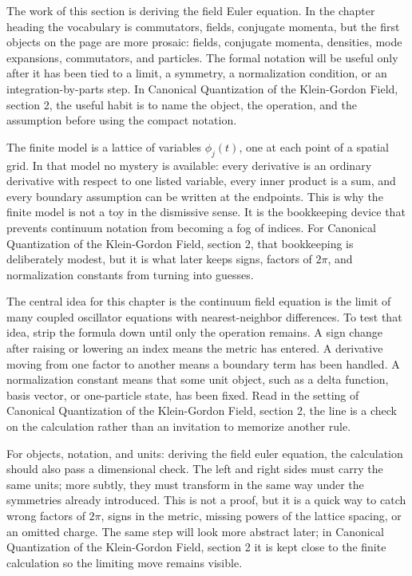 The work of this section is deriving the field Euler equation.  In the chapter heading the vocabulary is commutators, fields, conjugate momenta, but the first objects on the page are more prosaic: fields, conjugate momenta, densities, mode expansions, commutators, and particles.  The formal notation will be useful only after it has been tied to a limit, a symmetry, a normalization condition, or an integration-by-parts step.  In Canonical Quantization of the Klein-Gordon Field, section 2, the useful habit is to name the object, the operation, and the assumption before using the compact notation.

The finite model is a lattice of variables \(\phi_j(t)\), one at each point of a spatial grid.  In that model no mystery is available: every derivative is an ordinary derivative with respect to one listed variable, every inner product is a sum, and every boundary assumption can be written at the endpoints.  This is why the finite model is not a toy in the dismissive sense.  It is the bookkeeping device that prevents continuum notation from becoming a fog of indices.  For Canonical Quantization of the Klein-Gordon Field, section 2, that bookkeeping is deliberately modest, but it is what later keeps signs, factors of \(2\pi\), and normalization constants from turning into guesses.

The central idea for this chapter is the continuum field equation is the limit of many coupled oscillator equations with nearest-neighbor differences.  To test that idea, strip the formula down until only the operation remains.  A sign change after raising or lowering an index means the metric has entered.  A derivative moving from one factor to another means a boundary term has been handled.  A normalization constant means that some unit object, such as a delta function, basis vector, or one-particle state, has been fixed.  Read in the setting of Canonical Quantization of the Klein-Gordon Field, section 2, the line is a check on the calculation rather than an invitation to memorize another rule.

For objects, notation, and units: deriving the field euler equation, the calculation should also pass a dimensional check.  The left and right sides must carry the same units; more subtly, they must transform in the same way under the symmetries already introduced.  This is not a proof, but it is a quick way to catch wrong factors of \(2\pi\), signs in the metric, missing powers of the lattice spacing, or an omitted charge.  The same step will look more abstract later; in Canonical Quantization of the Klein-Gordon Field, section 2 it is kept close to the finite calculation so the limiting move remains visible.

